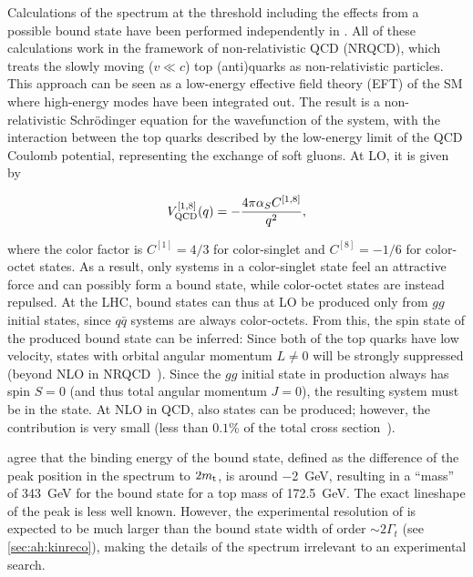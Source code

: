 Calculations of the \mWWbb spectrum at the \ttbar threshold including the effects from a possible bound state have been performed independently in . All of these calculations work in the framework of non-relativistic QCD (NRQCD), which treats the slowly moving ($v \ll c$) top (anti)quarks as non-relativistic particles. This approach can be seen as a low-energy effective field theory (EFT) of the SM where high-energy modes have been integrated out. The result is a non-relativistic Schr\"odinger equation for the wavefunction of the \ttbar system, with the interaction between the top quarks described by the low-energy limit of the QCD Coulomb potential, representing the exchange of soft gluons. At LO, it is given by~\cite{Kiyo:2008bv}

\begin{equation}
    V_{\mathrm{QCD}}^{[1,8]} (q) = - \frac{4 \pi \alpha_S C^{[1,8]}}{q^2} ,
\end{equation}

\noindent where the color factor is $C^{[1]} = 4/3$ for color-singlet and $C^{[8]} = -1/6$ for color-octet states. As a result, only \ttbar systems in a color-singlet state feel an attractive force and can possibly form a bound state, while color-octet states are instead repulsed. At the LHC, \ttbar bound states can thus at LO be produced only from $gg$ initial states, since $q\bar{q}$ systems are always color-octets. From this, the spin state of the produced bound state can be inferred: Since both of the top quarks have low velocity, states with orbital angular momentum $L \neq 0$ will be strongly suppressed (beyond NLO in NRQCD~\cite{Kiyo:2008bv}). Since the $gg$ initial state in \ttbar production always has spin $S = 0$ (and thus total angular momentum $J = 0$), the resulting \ttbar system must be in the  state. At NLO in QCD, also  states can be produced; however, the contribution is very small (less than $0.1\%$ of the total cross section~\cite{Kiyo:2008bv}).

 agree that the binding energy of the \ttbar bound state, defined as the difference of the peak position in the \mWWbb spectrum to $2 m_{\mathrm{t}}$, is around \SI{-2}{\GeV}, resulting in a ``mass'' of \SI{343}{\GeV} for the \ttbar bound state for a top mass of \SI{172.5}{\GeV}. The exact lineshape of the peak is less well known. However, the experimental resolution of \mWWbb is expected to be much larger than the bound state width of order $\sim 2 \Gamma_t$ (see \cref{sec:ah:kinreco}), making the details of the spectrum irrelevant to an experimental search.

